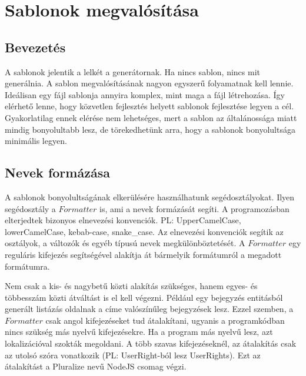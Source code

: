 \documentclass[a4paper,12pt,oneside]{report}
\begin{document}
\newpage
\section{Sablonok megvalósítása}
\subsection{Bevezetés}

\begin{justify}

	A sablonok jelentik a lelkét a generátornak. Ha nincs sablon, nincs mit generálnia. A sablon megvalósításának nagyon egyszerű folyamatnak kell lennie. Ideálisan egy fájl sablonja annyira komplex, mint maga a fájl létrehozása. Így elérhető lenne, hogy közvetlen fejlesztés helyett sablonok fejlesztése legyen a cél. Gyakorlatilag ennek elérése nem lehetséges, mert a sablon az általánossága miatt mindig bonyolultabb lesz, de törekedhetünk arra, hogy a sablonok bonyolultsága minimális legyen. 

\end{justify}

\newpage
\subsection{Nevek formázása}

\begin{justify}

	A sablonok bonyolultságának elkerülésére használhatunk segédosztályokat. Ilyen segédosztály a $Formatter$ is, ami a nevek formázását segíti. A programozásban elterjedtek bizonyos elnevezési konvenciók. PL: UpperCamelCase, lowerCamelCase, kebab-case, snake\_case. Az elnevezési konvenciók segítik az osztályok, a változók és egyéb típusú nevek megkülönböztetését. A $Formatter$ egy reguláris kifejezés segítségével alakítja át bármelyik formátumról a megadott formátumra. 

	Nem csak a kis- és nagybetű közti alakítás szükséges, hanem egyes- és többesszám közti átváltást is el kell végezni. Például egy bejegyzés entitásból generált listázás oldalnak a címe valószínűleg bejegyzések lesz. Ezzel szemben, a $Formatter$ csak angol kifejezéseket tud átalakítani, ugyanis a programkódban nincs szükség más nyelvű kifejezésekre. Ha a program más nyelvű lesz, azt lokalizációval szokták megoldani. A több szavas kifejezéseknél, az átalakítás csak az utolsó szóra vonatkozik (PL: UserRight-ból lesz UserRights). Ezt az átalakítást a Pluralize nevű NodeJS csomag végzi.

\end{justify}
\end{document}
